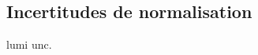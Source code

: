 \subsection{Incertitudes de normalisation}\label{chapter-HTT_analysis-section-systematics-normalization}


lumi unc.~\cite{LumiTwiki}

